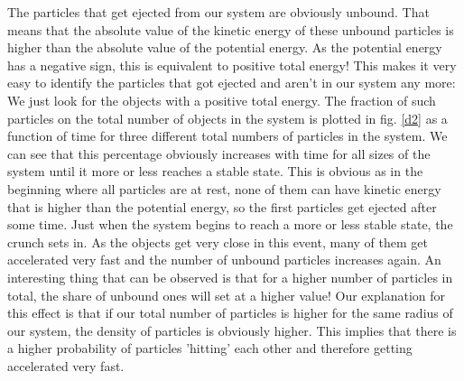 \documentclass[10pt,a4paper]{article}
\begin{document}
The particles that get ejected from our system are obviously unbound. That means that the absolute value of the kinetic energy of these unbound particles is higher than the absolute value of the potential energy. As the potential energy has a negative sign, this is equivalent to positive total energy! This makes it very easy to identify the particles that got ejected and aren't in our system any more: We just look for the objects with a positive total energy. The fraction of such particles on the total number of objects in the system is plotted in fig. \ref{d2} as a function of time for three different total numbers of particles in the system. We can see that this percentage obviously increases with time for all sizes of the system until it more or less reaches a stable state. This is obvious as in the beginning where all particles are at rest, none of them can have kinetic energy that is higher than the potential energy, so the first particles get ejected after some time. Just when the system begins to reach a more or less stable state, the crunch sets in. As the objects get very close in this event, many of them get accelerated very fast and the number of unbound particles increases again. An interesting thing that can be observed is that for a higher number of particles in total, the share of unbound ones will set at a higher value! Our explanation for this effect is that if our total number of particles is higher for the same radius of our system, the density of particles is obviously higher. This implies that there is a higher probability of particles 'hitting' each other and therefore getting accelerated very fast.
\end{document}
